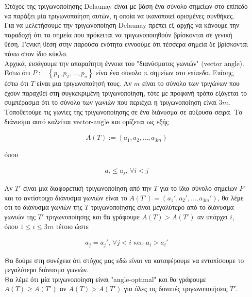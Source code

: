 \documentclass[oneside,12pt]{book}
\theoremstyle{definition}
\begin{document}
Στόχος της τριγωνοποίησης Delaunay είναι με βάση ένα σύνολο σημείων στο επίπεδο να παράξει μία τριγωνοποίηση αυτών, η οποία να ικανοποιεί ορισμένες συνθήκες. \\

Για να μελετήσουμε την τριγωνοποίηση Delaunay πρέπει εξ αρχής να κάνουμε την παραδοχή ότι τα σημεία που πρόκειται να τριγωνοποιηθούν βρίσκονται σε γενική θέση. Γενική θέση στην παρούσα ενότητα εννοούμε ότι τέσσερα σημεία δε βρίσκονται πάνω στον ίδιο κύκλο.   \\

Αρχικά, εισάγουμε την απαραίτητη έννοια του "διανύσματος γωνιών" (vector angle). Έστω ότι \(P := \left\{ p_1, p_2,...,p_n \right\}\) είνα ένα σύνολο \(n\) σημείων στο επίπεδο. Επίσης, έστω ότι \(Τ\) είναι μια τριγωνοποίησή τους. Αν \(m\) είναι το σύνολο των τριγώνων που έχουν παραχθεί στη συγκεκριμένη τριγωνοποίηση, τότε με προφανή τρόπο εξάγεται το συμπέρασμα ότι το σύνολο των γωνιών που περιέχει η τριγωνοποίηση είναι \(3m\). Τοποθετούμε τις γωνίες της τριγωνοποίησης σε ένα διάνυσμα σε αύξουσα σειρά. Το διάνυσμα αυτό καλείται vector-angle και ορίζεται ως εξής

\begin{align}
	A(T) := (a_1, a_2, ..., a_{3m})
\end{align}   

όπου

\begin{align}
	a_i \leq a_j \text{, } \forall i<j
\end{align}

Αν \(Τ'\) είναι μια διαφορετική τριγωνοποίηση από την \(Τ\) για το ίδιο σύνολο σημείων \(P\) και το αντίστοιχο διάνυσμα γωνιών είναι το \(A(T') = (a_{1}', a_{2}', ..., a_{3m}')\), θα λέμε ότι το διάνυσμα γωνιών της \(Τ\) τριγωνοποίησης είναι μεγαλύτερο από το διάνυσμα γωνιών της \(Τ'\) τριγωνοποίησης και θα γράφουμε \(Α(Τ) > Α(Τ')\) αν υπάρχει \(i\), όπου \(1 \leq i \leq 3m\) τέτοιο ώστε 

\begin{align*}
	a_j = a_{j}' \text{, } \forall j < i \text{ και } a_i > a_{i}'
\end{align*}

Θα δούμε στη συνέχεια ότι στόχος μας εδώ είναι να καταφέρουμε να εντοπίσουμε το μεγαλύτερο διάνυσμα γωνιών. \\

Θα λέμε ότι μία τριγωνοποίηση είναι "angle-optimal" και θα γράφουμε \(Α(Τ) \geq A(T')\) αν \(Α(Τ) > Α(Τ')\) για όλες τις δυνατές τριγωνοποιήσεις \(T'\). \\
\end{document}
